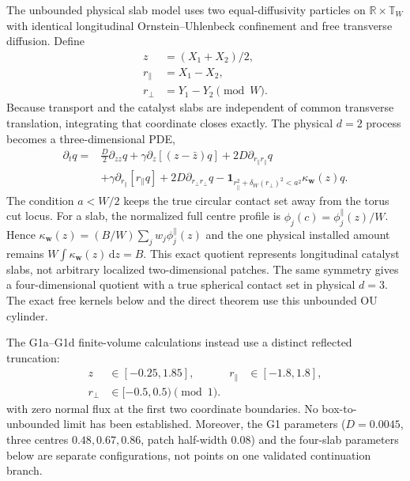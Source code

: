 \documentclass[aps,physrev,reprint,amsmath,amssymb,longbibliography,floatfix]{revtex4-2}
\newcommand{\dd}{\mathrm d}
\begin{document}
The unbounded physical slab model uses two equal-diffusivity particles on
$\mathbb R\times\mathbb T_W$ with identical longitudinal
Ornstein--Uhlenbeck confinement and free transverse diffusion.  Define
\begin{equation}
\begin{aligned}
 z&=(X_1+X_2)/2,\\
 r_\parallel&=X_1-X_2,\\
 r_\perp&=Y_1-Y_2\pmod W.
\end{aligned}
\end{equation}
Because transport and the catalyst slabs are independent of common transverse
translation, integrating that coordinate closes exactly.  The physical
$d=2$ process becomes a three-dimensional PDE,
\begin{align}
\partial_tq={}&
\frac D2\partial_{zz}q
+\gamma\partial_z[(z-\bar z)q]
+2D\partial_{r_\parallel r_\parallel}q\nonumber\\
&+\gamma\partial_{r_\parallel}[r_\parallel q]
+2D\partial_{r_\perp r_\perp}q
-\mathbf1_{r_\parallel^2+\delta_W(r_\perp)^2<a^2}
\kappa_{\bm w}(z)q.
\label{eq:quotient}
\end{align}
The condition $a<W/2$ keeps the true circular contact set away from the torus
cut locus.  For a slab, the normalized full centre profile is
$\phi_j(c)=\phi_j^\parallel(z)/W$.  Hence
$\kappa_{\bm w}(z)=(B/W)\sum_jw_j\phi_j^\parallel(z)$ and the one physical
installed amount remains $W\int\kappa_{\bm w}(z)\,\dd z=B$.
This exact quotient represents longitudinal catalyst slabs, not arbitrary
localized two-dimensional patches.  The same symmetry gives a four-dimensional
quotient with a true spherical contact set in physical $d=3$.  The exact free
kernels below and the direct theorem use this unbounded OU cylinder.

The G1a--G1d finite-volume calculations instead use a distinct reflected
truncation:
\begin{equation}
\begin{aligned}
 z&\in[-0.25,1.85],&r_\parallel&\in[-1.8,1.8],\\
 r_\perp&\in[-0.5,0.5)\pmod 1.
\end{aligned}
\label{eq:g1box}
\end{equation}
with zero normal flux at the first two coordinate boundaries.  No
box-to-unbounded limit has been established.  Moreover, the G1 parameters
($D=0.0045$, three centres $0.48,0.67,0.86$, patch half-width $0.08$)
and the four-slab parameters below are separate configurations, not points on
one validated continuation branch.
\end{document}
